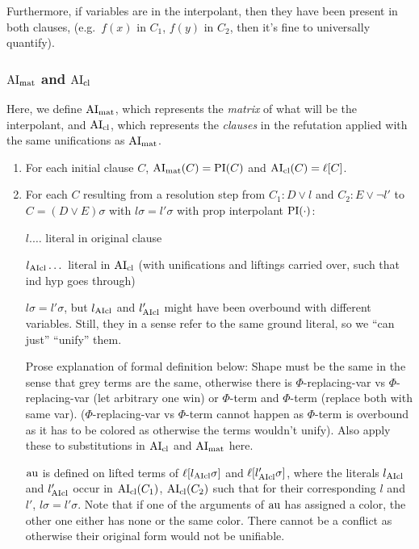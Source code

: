 \documentclass[,%
	paper=a4,%
	DIV14, %
	twoside=false,%
	liststotoc,
	bibtotoc,
	draft=false,%
	numbers=noendperiod
]{scrartcl}
\begin{document}
Furthermore, if variables are in the interpolant, then they have been present in both clauses, (e.g.~$f(x)$ in $C_1$, $f(y)$ in $C_2$, then it's fine to universally quantify).


\subsubsection{$\operatorname{AI}_\mathrm{mat}$ and $\operatorname{AI}_\mathrm{cl}$}

Here, we define $\operatorname{AI}_\mathrm{mat}$, which represents the \emph{matrix} of what will be the interpolant, and $\operatorname{AI}_\mathrm{cl}$, which represents the \emph{clauses} in the refutation applied with the same unifications as $\operatorname{AI}_\mathrm{mat}$.

\begin{enumerate}
	\item 
		For each initial clause $C$, $\operatorname{AI}_\mathrm{mat}(C) = \operatorname{PI}(C)$ and $\operatorname{AI}_\mathrm{cl}(C) = \ell[C]$.

	\item
		For each $C$ resulting from a resolution step from $C_1: D\lor l$ and $C_2: E\lor \lnot l'$ to $C = (D \lor E)\sigma$ with $l\sigma = l'\sigma$ with prop interpolant $\operatorname{PI}(\cdot)$:

		$l.\dotsc$ literal in original clause

		$l_{\operatorname{AIcl}}\dotsc$ literal in $\operatorname{AI}_\mathrm{cl}$ (with unifications and liftings carried over, such that ind hyp goes through)


		$l\sigma = l'\sigma$, but $l_{\operatorname{AIcl}}$ and $l_{\operatorname{AIcl}}'$ might have been overbound with different variables. Still, they in a sense refer to the same ground literal, so we ``can just'' ``unify'' them.

		Prose explanation of formal definition below: Shape must be the same in the sense that grey terms are the same, otherwise there is $\Phi$-replacing-var vs $\Phi$-replacing-var (let arbitrary one win) or $\Phi$-term and $\Phi$-term (replace both with same var). 
		($\Phi$-replacing-var vs $\Phi$-term cannot happen as $\Phi$-term is overbound as it has to be colored as otherwise the terms wouldn't unify).
		Also apply these to substitutions in $\operatorname{AI}_\mathrm{cl}$ and $\operatorname{AI}_\mathrm{mat}$ here.

		$\operatorname{au}$ is defined on lifted terms of $\ell[l_{\operatorname{AIcl}}\sigma]$ and $\ell[l_{\operatorname{AIcl}}'\sigma]$, where the literals $l_{\operatorname{AIcl}}$ and $l_{\operatorname{AIcl}}'$
		occur in $\operatorname{AI}_\mathrm{cl}(C_1)$, $\operatorname{AI}_\mathrm{cl}(C_2)$ such that for their corresponding $l$ and $l'$, $l\sigma = l'\sigma$.
		Note that if one of the arguments of $\operatorname{au}$ has assigned a color, the other one either has none or the same color.
		There cannot be a conflict as otherwise their original form would not be unifiable.


\end{enumerate}
\end{document}
